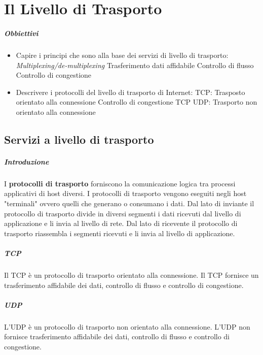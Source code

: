 \chapter{Il Livello di Trasporto}
\thispagestyle{chapterInit}
\paragraph{Obbiettivi}
    \begin{itemize}
        \item Capire i principi che sono alla base dei servizi di livello di trasporto:
            \subitem \textit{Multiplexing/de-multiplexing}
            \subitem Trasferimento dati affidabile
            \subitem Controllo di flusso
            \subitem Controllo di congestione
        \item Descrivere i protocolli del livello di trasporto di Internet:
            \subitem \Acrshort*{TCP}: Trasposto orientato alla connessione
            \subitem Controllo di congestione TCP
            \subitem \Acrshort*{UDP}: Trasporto non orientato alla connessione
    \end{itemize}
\section{Servizi a livello di trasporto}
    \paragraph{Introduzione} I \textbf{protocolli di trasporto} forniscono la comunicazione logica tra processi applicativi di host diversi. I protocolli di trasporto vengono eseguiti negli host "terminali" ovvero quelli che generano o consumano i dati. Dal lato di inviante il protocollo di trasporto divide in diversi segmenti i dati ricevuti dal livello di applicazione e li invia al livello di rete. Dal lato di ricevente il protocollo di trasporto riassembla i segmenti ricevuti e li invia al livello di applicazione.
    \paragraph{\Acrshort*{TCP}} Il \acrfull*{TCP} è un protocollo di trasporto orientato alla connessione. Il \Acrshort*{TCP} fornisce un trasferimento affidabile dei dati, controllo di flusso e controllo di congestione.
    \paragraph{\Acrshort*{UDP}} L'\acrfull*{UDP} è un protocollo di trasporto non orientato alla connessione. L'\Acrshort*{UDP} non fornisce trasferimento affidabile dei dati, controllo di flusso e controllo di congestione.
